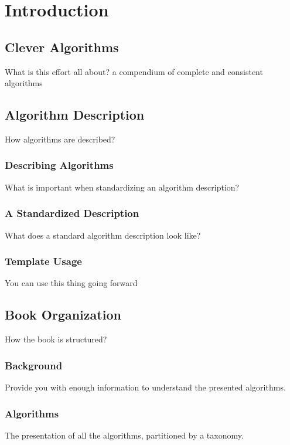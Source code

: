 \chapter{Introduction}
\label{chap:intro}

\section{Clever Algorithms}
What is this effort all about?
a compendium of complete and consistent algorithms



\section{Algorithm Description}
How algorithms are described?

\subsection{Describing Algorithms}
What is important when standardizing an algorithm description?

\subsection{A Standardized Description}
What does a standard algorithm description look like?

\subsection{Template Usage}
You can use this thing going forward



\section{Book Organization}
How the book is structured?

\subsection{Background}
Provide you with enough information to understand the presented algorithms.

\subsection{Algorithms}
The presentation of all the algorithms, partitioned by a taxonomy.

